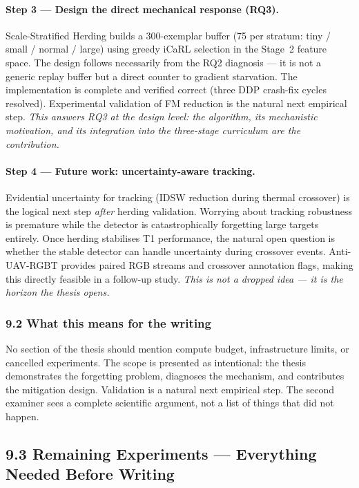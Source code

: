 \paragraph{Step 3 — Design the direct mechanical response (RQ3).}
Scale-Stratified Herding builds a 300-exemplar buffer (75 per stratum:
tiny / small / normal / large) using greedy iCaRL selection in the Stage~2
feature space. The design follows necessarily from the RQ2 diagnosis — it
is not a generic replay buffer but a direct counter to gradient starvation.
The implementation is complete and verified correct (three DDP crash-fix
cycles resolved). Experimental validation of FM reduction is the natural
next empirical step. \textit{This answers RQ3 at the design level: the
algorithm, its mechanistic motivation, and its integration into the
three-stage curriculum are the contribution.}

\paragraph{Step 4 — Future work: uncertainty-aware tracking.}
Evidential uncertainty for tracking (IDSW reduction during thermal
crossover) is the logical next step \textit{after} herding validation.
Worrying about tracking robustness is premature while the detector is
catastrophically forgetting large targets entirely. Once herding
stabilises T1 performance, the natural open question is whether the
stable detector can handle uncertainty during crossover events.
Anti-UAV-RGBT provides paired RGB streams and crossover annotation flags,
making this directly feasible in a follow-up study. \textit{This is not
a dropped idea — it is the horizon the thesis opens.}

\subsubsection*{9.2 What this means for the writing}

No section of the thesis should mention compute budget, infrastructure
limits, or cancelled experiments. The scope is presented as intentional:
the thesis demonstrates the forgetting problem, diagnoses the mechanism,
and contributes the mitigation design. Validation is a natural next
empirical step. The second examiner sees a complete scientific argument,
not a list of things that did not happen.

\subsection*{9.3 Remaining Experiments — Everything Needed Before Writing}

